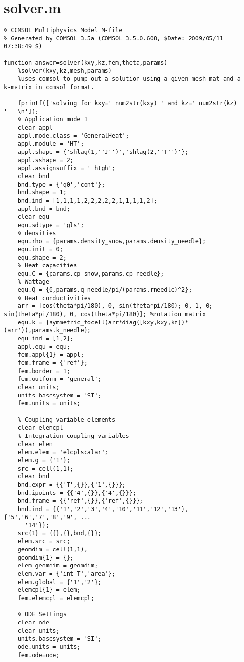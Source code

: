 \section{solver.m}
\small
\begin{verbatim}
% COMSOL Multiphysics Model M-file
% Generated by COMSOL 3.5a (COMSOL 3.5.0.608, $Date: 2009/05/11 07:38:49 $)

function answer=solver(kxy,kz,fem,theta,params)
    %solver(kxy,kz,mesh,params)
    %uses comsol to pump out a solution using a given mesh-mat and a k-matrix in comsol format.

    fprintf(['solving for kxy=' num2str(kxy) ' and kz=' num2str(kz) '...\n']);
    % Application mode 1
    clear appl
    appl.mode.class = 'GeneralHeat';
    appl.module = 'HT';
    appl.shape = {'shlag(1,''J'')','shlag(2,''T'')'};
    appl.sshape = 2;
    appl.assignsuffix = '_htgh';
    clear bnd
    bnd.type = {'q0','cont'};
    bnd.shape = 1;
    bnd.ind = [1,1,1,1,2,2,2,2,2,1,1,1,1,2];
    appl.bnd = bnd;
    clear equ
    equ.sdtype = 'gls';
    % densities
    equ.rho = {params.density_snow,params.density_needle};
    equ.init = 0;
    equ.shape = 2;
    % Heat capacities
    equ.C = {params.cp_snow,params.cp_needle};
    % Wattage
    equ.Q = {0,params.q_needle/pi/(params.rneedle)^2};
    % Heat conductivities
    arr = [cos(theta*pi/180), 0, sin(theta*pi/180); 0, 1, 0; -sin(theta*pi/180), 0, cos(theta*pi/180)]; %rotation matrix
    equ.k = {symmetric_tocell(arr*diag([kxy,kxy,kz])*(arr')),params.k_needle};
    equ.ind = [1,2];
    appl.equ = equ;
    fem.appl{1} = appl;
    fem.frame = {'ref'};
    fem.border = 1;
    fem.outform = 'general';
    clear units;
    units.basesystem = 'SI';
    fem.units = units;

    % Coupling variable elements
    clear elemcpl
    % Integration coupling variables
    clear elem
    elem.elem = 'elcplscalar';
    elem.g = {'1'};
    src = cell(1,1);
    clear bnd
    bnd.expr = {{'T',{}},{'1',{}}};
    bnd.ipoints = {{'4',{}},{'4',{}}};
    bnd.frame = {{'ref',{}},{'ref',{}}};
    bnd.ind = {{'1','2','3','4','10','11','12','13'},{'5','6','7','8','9', ...
      '14'}};
    src{1} = {{},{},bnd,{}};
    elem.src = src;
    geomdim = cell(1,1);
    geomdim{1} = {};
    elem.geomdim = geomdim;
    elem.var = {'int_T','area'};
    elem.global = {'1','2'};
    elemcpl{1} = elem;
    fem.elemcpl = elemcpl;

    % ODE Settings
    clear ode
    clear units;
    units.basesystem = 'SI';
    ode.units = units;
    fem.ode=ode;


\end{verbatim}
